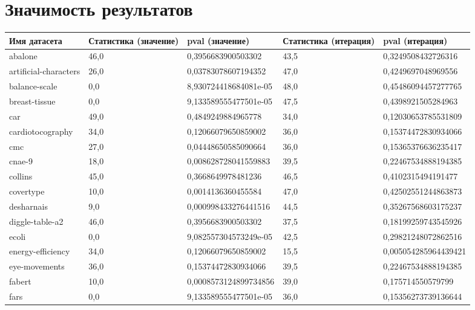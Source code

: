 \documentclass[times,specification,annotation]{itmo-student-thesis}
\begin{document}
\chapter{Значимость результатов}\label{app:importance}
\begin{center} 
	\begin{longtable}{ |m{3.4cm}|m{1.5cm}|m{4.7cm}|m{1.5cm}|m{4.7cm}| } 
		\hline %
		\textbf{Имя датасета} & \textbf{Статистика (значение)} & \textbf{pval (значение)} & \textbf{Статистика (итерация)} &  \textbf{pval (итерация)} \\
		\hline\hline
		abalone & 46,0 & 0,3956683900503302 & 43,5 & 0,3249508432726316 \\
		\hline
		artificial-characters & 26,0 & 0,03783078607194352 & 47,0 & 0,4249697048969556 \\
		\hline
		balance-scale & 0,0 & 8,930724418684081e-05 & 48,0 & 0,45486094457277765 \\
		\hline
		breast-tissue & 0,0 & 9,133589555477501e-05 & 47,5 & 0,4398921505284963 \\
		\hline
		car & 49,0 & 0,4849249884965778 & 34,0 & 0,12030653785531809 \\
		\hline
		cardiotocography & 34,0 & 0,12066079650859002 & 36,0 & 0,15374472830934066 \\
		\hline
		cmc & 27,0 & 0,04448650585090664 & 36,0 & 0,15365376636235417 \\
		\hline
		cnae-9 & 18,0 & 0,008628728041559883 & 39,5 & 0,22467534888194385 \\
		\hline
		collins & 45,0 & 0,3668649978481236 & 46,5 & 0,4102315494191477 \\
		\hline
		covertype & 10,0 & 0,0014136360455584 & 47,0 & 0,42502551244863873 \\
		\hline
		desharnais & 9,0 & 0,000998433276441516 & 44,5 & 0,35267568603175237 \\
		\hline
		diggle-table-a2 & 46,0 & 0,3956683900503302 & 37,5 & 0,18199259743545926 \\
		\hline
		ecoli & 0,0 & 9,082557304573249e-05 & 42,5 & 0,29821248072862516 \\
		\hline
		energy-efficiency & 34,0 & 0,12066079650859002 & 15,5 & 0,005054285964439421 \\
		\hline
		eye-movements & 36,0 & 0,15374472830934066 & 39,5 & 0,22467534888194385 \\
		\hline
		fabert & 10,0 & 0,0008573124899734856 & 39,0 & 0,175714550579799 \\
		\hline
		fars & 0,0 & 9,133589555477501e-05 & 36,0 & 0,15356273739136644 \\

\end{longtable}
\end{center}
\end{document}
